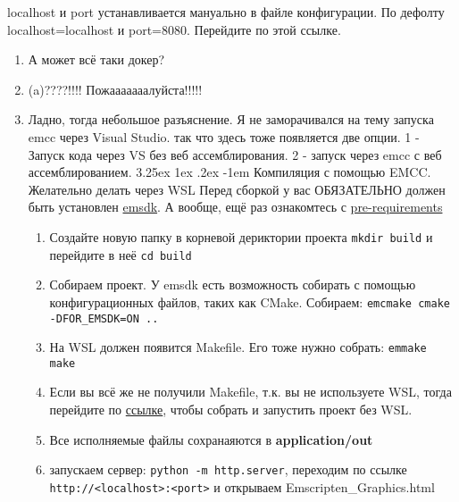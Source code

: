 \documentclass[12pt]{article}
\makeatletter
\renewcommand\paragraph{\@startsection{paragraph}{5}{\z@}%
  {3.25ex \@plus1ex \@minus.2ex}%
  {-1em}%
  {\normalfont\normalsize\bfseries}}
\makeatother
\begin{document}
\begin{enumerate}
\begin{tcolorbox}[colback=green!10!white,colframe=green!70!black,title=\textbf{Docker}]
\begin{enumerate}
            localhost и port устанавливается мануально в файле конфигурации. По дефолту 
            localhost=localhost и port=8080. Перейдите по этой ссылке.
          \end{enumerate}
        \end{tcolorbox}
        \begin{tcolorbox}[colback=yellow!10!white,colframe=red!75!black,title=\textbf{Not Docker}]
          \begin{enumerate}
            \item А может всё таки докер?
            \item (a)????!!!! Пожааааааалуйста!!!!!
            \item Ладно, тогда небольшое разъяснение. 
            Я не заморачивался на тему запуска emcc через Visual Studio.
            так что здесь тоже появляется две опции. 1 - Запуск кода через
            VS без веб ассемблирования. 2 - запуск через emcc с веб ассемблированием.
            \paragraph{Компиляция с помощью EMCC. Желательно делать через WSL}
            Перед сборкой у вас ОБЯЗАТЕЛЬНО должен быть установлен \href{https://emscripten.org/docs/getting_started/downloads.html}{emsdk}.
            А вообще, ещё раз ознакомтесь с \hyperref[sec:pre_req]{pre-requirements}
            \begin{enumerate}
              \item Создайте новую папку в корневой дериктории проекта
              \colorbox{gray!25!}{\texttt{mkdir build}} и перейдите в неё 
              \colorbox{gray!25!}{\texttt{cd build}}
              \item Собираем проект. У emsdk есть возможность собирать с помощью
              конфигурационных файлов, таких как CMake. Собираем:
              \colorbox{gray!25!}{\texttt{emcmake cmake -DFOR\_EMSDK=ON ..}}
              \item На WSL должен появится Makefile. Его тоже нужно собрать:
              \colorbox{gray!25!}{\texttt{emmake make}}
              \item Если вы всё же не получили Makefile, т.к. вы не используете
              WSL, тогда перейдите по \href{https://stackoverflow.com/questions/21387504/cmake-and-make-in-windows}{ссылке}, 
              чтобы собрать и запустить проект без WSL. 
              \item Все исполняемые файлы сохранаяются в \textbf{application/out}
              \item запускаем сервер: 
              \colorbox{gray!25!}{\texttt{python -m http.server}}, переходим
              по ссылке \colorbox{gray!25!}{\texttt{http://<localhost>:<port>}} и открываем
              Emscripten\_Graphics.html
            \end{enumerate}  
          \end{enumerate}
        \end{tcolorbox}
        \begin{tcolorbox}[colback=yellow!10!white,colframe=red!75!black]

\end{tcolorbox}
\end{enumerate}
\end{document}
